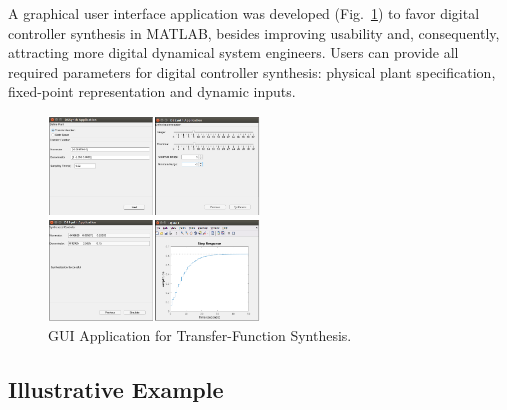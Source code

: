 \documentclass[sigconf]{acmart}
\begin{document}
A graphical user interface application was developed (Fig.~\ref{fig:gui-for-tf}) 
to favor digital controller synthesis in MATLAB, besides improving usability and, 
consequently, attracting more digital dynamical system engineers. Users can provide all 
required parameters for digital controller synthesis: physical plant specification, 
fixed-point representation and dynamic inputs. 
%
\begin{figure}
  \includegraphics[width=0.5\textwidth]{screens_dssynth.png}
  \caption{GUI Application for Transfer-Function Synthesis.}
  \label{fig:gui-for-tf}
\end{figure}

\subsection{Illustrative Example}
\end{document}
